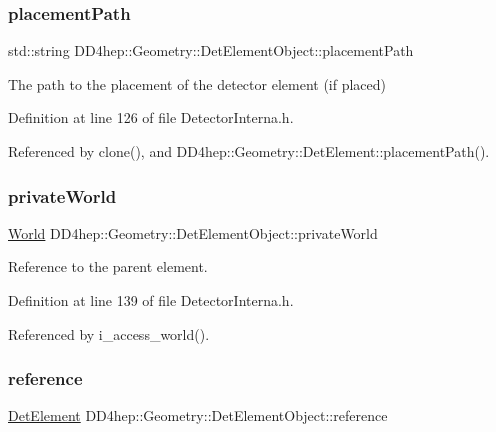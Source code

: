\subsubsection{\texorpdfstring{placement\+Path}{placementPath}}
{\footnotesize\ttfamily std\+::string D\+D4hep\+::\+Geometry\+::\+Det\+Element\+Object\+::placement\+Path}



The path to the placement of the detector element (if placed) 



Definition at line 126 of file Detector\+Interna.\+h.



Referenced by clone(), and D\+D4hep\+::\+Geometry\+::\+Det\+Element\+::placement\+Path().

\hypertarget{class_d_d4hep_1_1_geometry_1_1_det_element_object_ace2a84b1e32a5263768b573df15d69ff}{}\label{class_d_d4hep_1_1_geometry_1_1_det_element_object_ace2a84b1e32a5263768b573df15d69ff} 
\subsubsection{\texorpdfstring{private\+World}{privateWorld}}
{\footnotesize\ttfamily \hyperlink{class_d_d4hep_1_1_geometry_1_1_world}{World} D\+D4hep\+::\+Geometry\+::\+Det\+Element\+Object\+::private\+World}



Reference to the parent element. 



Definition at line 139 of file Detector\+Interna.\+h.



Referenced by i\+\_\+access\+\_\+world().

\hypertarget{class_d_d4hep_1_1_geometry_1_1_det_element_object_a6b87ce69ec6c292e36e87f5fed651278}{}\label{class_d_d4hep_1_1_geometry_1_1_det_element_object_a6b87ce69ec6c292e36e87f5fed651278} 
\subsubsection{\texorpdfstring{reference}{reference}}
{\footnotesize\ttfamily \hyperlink{class_d_d4hep_1_1_geometry_1_1_det_element}{Det\+Element} D\+D4hep\+::\+Geometry\+::\+Det\+Element\+Object\+::reference}



